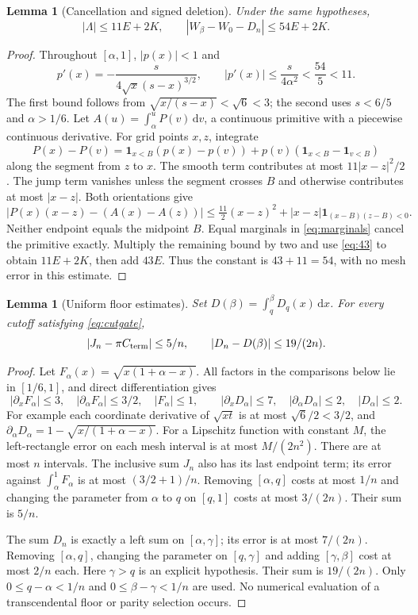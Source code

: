 \documentclass[11pt,a4paper]{article}
\newtheorem{lemma}[theorem]{Lemma}
\theoremstyle{remark}\newtheorem{remark}[theorem]{Remark}
\newcommand{\Cterm}{C_{\rm term}}
\newcommand{\ind}{\mathbf 1}
\newcommand{\dd}{\,\mathrm d}
\begin{document}
\begin{lemma}[Cancellation and signed deletion]\label{lem:54}
Under the same hypotheses,
\begin{equation}\label{eq:54}
|\Lambda|\le11E+2K,\qquad
|W_\beta-W_0-D_n|\le54E+2K.
\end{equation}
\end{lemma}
\begin{proof}
Throughout $[\alpha,1]$, $|p(x)|<1$ and
\[
p'(x)=-\frac{s}{4\sqrt x(s-x)^{3/2}},\qquad
|p'(x)|\le\frac{s}{4\alpha^2}<\frac{54}{5}<11.
\]
The first bound follows from $\sqrt{x/(s-x)}<\sqrt6<3$;
the second uses $s<6/5$ and $\alpha>1/6$.
Let $A(u)=\int_\alpha^u P(v)\dd v$, a continuous primitive with a
piecewise continuous derivative. For grid points $x,z$, integrate
\[
P(x)-P(v)=\ind_{x<B}(p(x)-p(v))
+p(v)(\ind_{x<B}-\ind_{v<B})
\]
along the segment from $z$ to $x$. The smooth term contributes at most
$11|x-z|^2/2$. The jump term vanishes unless the segment crosses $B$
and otherwise contributes at most $|x-z|$. Both orientations give
\[
|P(x)(x-z)-(A(x)-A(z))|
\le\tfrac{11}{2}(x-z)^2+|x-z|\ind_{(x-B)(z-B)<0}.
\]
Neither endpoint equals the midpoint $B$. Equal marginals in
\eqref{eq:marginals} cancel the primitive exactly. Multiply the remaining
bound by two and use \eqref{eq:43} to obtain $11E+2K$, then add $43E$.
Thus the constant is $43+11=54$, with no mesh error in this estimate.
\end{proof}

\begin{lemma}[Uniform floor estimates]\label{lem:floors}
Set $D(\beta)=\int_q^\beta D_q(x)\dd x$.
For every cutoff satisfying \eqref{eq:cutgate},
\begin{equation}\label{eq:floorerrors}
|J_n-\pi\Cterm|\le5/n,\qquad |D_n-D(\beta)|\le19/(2n).
\end{equation}
\end{lemma}
\begin{proof}
Let $F_\alpha(x)=\sqrt{x(1+\alpha-x)}$. All factors in the
comparisons below lie in $[1/6,1]$, and direct differentiation gives
\[
|\partial_xF_\alpha|\le3,\quad
|\partial_\alpha F_\alpha|\le3/2,\quad |F_\alpha|\le1,
\qquad
|\partial_xD_\alpha|\le7,\quad
|\partial_\alpha D_\alpha|\le2,\quad |D_\alpha|\le2.
\]
For example each coordinate derivative of $\sqrt{xt}$ is at most
$\sqrt6/2<3/2$, and
$\partial_\alpha D_\alpha=1-\sqrt{x/(1+\alpha-x)}$.
For a Lipschitz function with constant $M$, the left-rectangle error
on each mesh interval is at most $M/(2n^2)$. There are at most $n$
intervals. The inclusive sum $J_n$ also has its last endpoint term;
its error against $\int_\alpha^1F_\alpha$ is at most $(3/2+1)/n$.
Removing $[\alpha,q]$ costs at most $1/n$ and changing the parameter
from $\alpha$ to $q$ on $[q,1]$ costs at most $3/(2n)$. Their sum is $5/n$.

The sum $D_n$ is exactly a left sum on $[\alpha,\gamma]$; its error
is at most $7/(2n)$. Removing $[\alpha,q]$, changing the parameter on
$[q,\gamma]$ and adding $[\gamma,\beta]$ cost at most $2/n$ each.
Here $\gamma>q$ is an explicit hypothesis. Their sum is $19/(2n)$.
Only $0\le q-\alpha<1/n$ and $0\le\beta-\gamma<1/n$ are used.
No numerical evaluation of a transcendental floor or parity selection occurs.
\end{proof}
\end{document}
